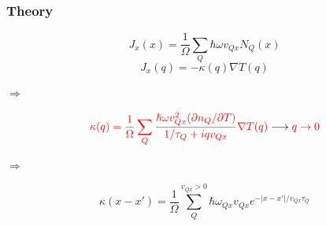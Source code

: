 \documentclass{beamer}
\begin{document}

\begin{frame}
\frametitle{Theory}
\begin{equation*}
J_x(x)=\frac{1}{\Omega}\sum\limits_{Q} \hbar \omega v_{Qx}N_Q(x)
\end{equation*}
\begin{equation*}
J_x(q)=-\kappa(q)\nabla{T(q)} 
\end{equation*}
\begin{center}
$\Longrightarrow$
\end{center}
\begin{equation*}
\textcolor{red}{\kappa(q)=\frac{1}{\Omega}\sum\limits_{Q} \frac{\hbar \omega v_{Qx}^2(\partial n_Q / \partial T)}{1/\tau_Q +iqv_{Qx}}\nabla{T(q)}} \longrightarrow \textcolor{red}{q\rightarrow 0} 
\end{equation*}
\begin{center}
$\Longrightarrow$
\end{center}
\begin{equation*}
\kappa(x-x')=\frac{1}{\Omega}\sum\limits_{Q}^{v_{Qx}>0}\hbar \omega_{Qx}v_{Qx}e^{-\vert{x-x'}\vert{/}v_{Qx}\tau_{Q}}
\end{equation*}
\end{frame}

\end{document}
